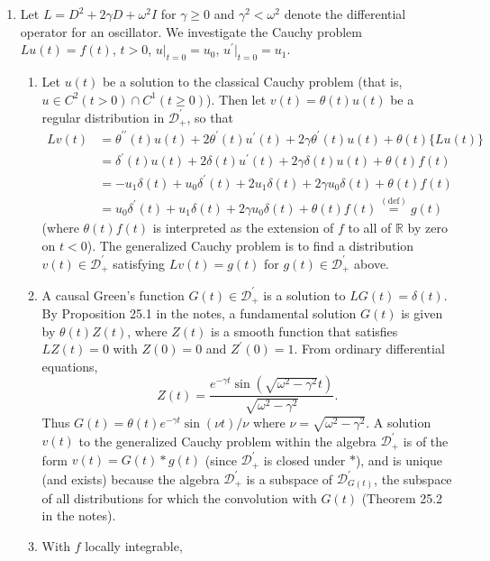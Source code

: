 \documentclass[11pt]{article}
\newcommand{\eq}[1]{\overset{(#1)}{=}}
\begin{document}
\begin{enumerate}
    \item Let $L = D^2+2\gamma D+ \omega^2I$ for $\gamma\geq 0$ and $\gamma^2<\omega^2$ denote the differential operator for an oscillator. We investigate the Cauchy problem $Lu(t) = f(t)$, $t>0$, $u|_{t=0} = u_0$, $u^\prime|_{t=0} = u_1$.
    \begin{enumerate}[label=(\roman*)]
        \item Let $u(t)$ be a solution to the classical Cauchy problem (that is, $u\in C^2(t>0)\cap C^1(t\geq 0)$). Then let $v(t) = \theta(t)u(t)$ be a regular distribution in $\mathcal D^\prime_+$, so that 
        \begin{align*}
            Lv(t) &= \theta^{\prime\prime}(t)u(t) + 2\theta^\prime(t)u^\prime(t) + 2\gamma\theta^\prime(t)u(t) + \theta(t)\{Lu(t)\}\\
            &= \delta^\prime(t)u(t) + 2\delta(t)u^\prime(t) + 2\gamma\delta(t)u(t) + \theta(t)f(t)\\
            &= -u_1\delta(t) + u_0\delta^\prime(t) + 2u_1\delta(t) + 2\gamma u_0\delta(t) + \theta(t)f(t)\\
            &= u_0\delta^\prime(t) + u_1\delta(t) + 2\gamma u_0\delta(t) + \theta(t)f(t) \eq{\text{def}} g(t)
        \end{align*} (where $\theta(t)f(t)$ is interpreted as the extension of $f$ to all of $\mathbb R$ by zero on $t<0$). The generalized Cauchy problem is to find a distribution $v(t)\in \mathcal D^\prime_+$ satisfying $Lv(t) = g(t)$ for $g(t)\in \mathcal D^\prime_+$ above.
        \item A causal Green's function $G(t)\in \mathcal D^\prime_+$ is a solution to $LG(t) = \delta(t)$. By Proposition 25.1 in the notes, a fundamental solution $G(t)$ is given by $\theta(t)Z(t)$, where $Z(t)$ is a smooth function that satisfies $LZ(t) = 0$ with $Z(0) = 0$ and $ Z^\prime(0) = 1$. From ordinary differential equations, \[Z(t) = \frac{e^{-\gamma t}\sin(\sqrt{\omega^2-\gamma^2}t)}{\sqrt{\omega^2-\gamma^2}}.\] Thus $G(t) = \theta(t)e^{-\gamma t}\sin(\nu t)/\nu$ where $\nu = \sqrt{\omega^2-\gamma^2}$. A solution $v(t)$ to the generalized Cauchy problem within the algebra $\mathcal D^\prime_+$ is of the form $v(t) = G(t)\ast g(t)$ (since $\mathcal D^\prime_+$ is closed under $\ast$), and is unique (and exists) because the algebra $\mathcal D^\prime_+$ is a subspace of $\mathcal D^\prime_{G(t)}$, the subspace of all distributions for which the convolution with $G(t)$ (Theorem 25.2 in the notes). 
        \item With $f$ locally integrable, 

\end{enumerate}
\end{enumerate}
\end{document}
